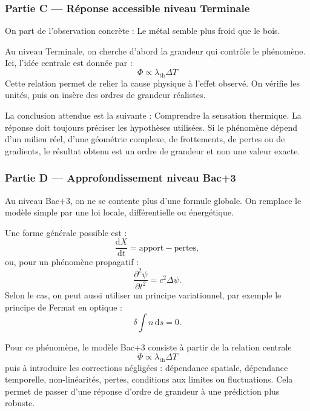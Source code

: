 \documentclass[11pt,a4paper]{article}
\begin{document}
\subsubsection*{Partie C — Réponse accessible niveau Terminale}

\begin{corrigebox}
On part de l'observation concrète : Le métal semble plus froid que le bois.

Au niveau Terminale, on cherche d'abord la grandeur qui contrôle le phénomène. Ici, l'idée centrale est donnée par :
\[
\Phi\propto\lambda_{\mathrm{th}}\Delta T
\]
Cette relation permet de relier la cause physique à l'effet observé. On vérifie les unités, puis on insère des ordres de grandeur réalistes.

La conclusion attendue est la suivante : Comprendre la sensation thermique. La réponse doit toujours préciser les hypothèses utilisées. Si le phénomène dépend d'un milieu réel, d'une géométrie complexe, de frottements, de pertes ou de gradients, le résultat obtenu est un ordre de grandeur et non une valeur exacte.
\end{corrigebox}

\subsubsection*{Partie D — Approfondissement niveau Bac+3}

\begin{approfondissementbox}
Au niveau Bac+3, on ne se contente plus d'une formule globale. On remplace le modèle simple par une loi locale, différentielle ou énergétique.

Une forme générale possible est :
\[
\frac{\mathrm d X}{\mathrm dt}=\text{apport}-\text{pertes},
\]
ou, pour un phénomène propagatif :
\[
\frac{\partial^2 \psi}{\partial t^2}=c^2\Delta\psi.
\]
Selon le cas, on peut aussi utiliser un principe variationnel, par exemple le principe de Fermat en optique :
\[
\delta \int n\,\mathrm ds=0.
\]

Pour ce phénomène, le modèle Bac+3 consiste à partir de la relation centrale
\[
\Phi\propto\lambda_{\mathrm{th}}\Delta T
\]
puis à introduire les corrections négligées : dépendance spatiale, dépendance temporelle, non-linéarités, pertes, conditions aux limites ou fluctuations. Cela permet de passer d'une réponse d'ordre de grandeur à une prédiction plus robuste.
\end{approfondissementbox}
\end{document}
